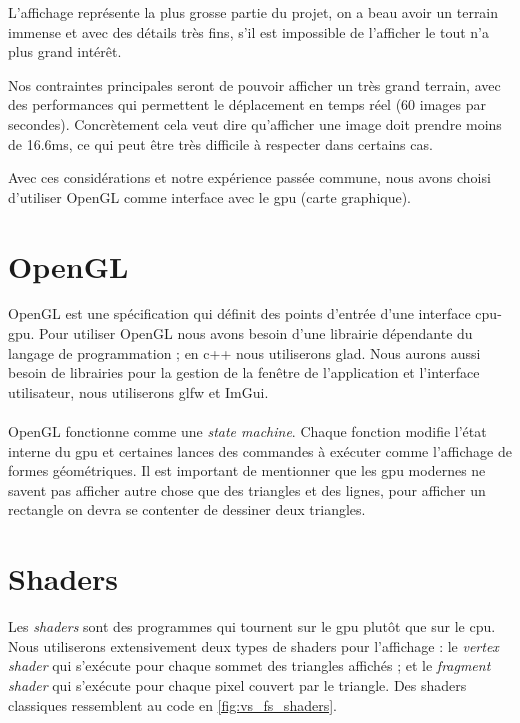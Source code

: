 \documentclass{EPUProjetDi}
\begin{document}
L'affichage représente la plus grosse partie du projet, on a beau avoir un terrain immense et avec des détails très fins, s'il est impossible de l'afficher le tout n'a plus grand intérêt.

Nos contraintes principales seront de pouvoir afficher un très grand terrain, avec des performances qui permettent le déplacement en temps réel (60 images par secondes). Concrètement cela veut dire qu'afficher une image doit prendre moins de 16.6ms, ce qui peut être très difficile à respecter dans certains cas.

Avec ces considérations et notre expérience passée commune, nous avons choisi d'utiliser OpenGL comme interface avec le gpu (carte graphique).

\section{OpenGL}

OpenGL est une spécification qui définit des points d'entrée d'une interface cpu-gpu. Pour utiliser OpenGL nous avons besoin d'une librairie dépendante du langage de programmation ; en c++ nous utiliserons glad. Nous aurons aussi besoin de librairies pour la gestion de la fenêtre de l'application et l'interface utilisateur, nous utiliserons glfw et ImGui.


\paragraph{}
OpenGL fonctionne comme une \textit{state machine}. Chaque fonction modifie l'état interne du gpu et certaines lances des commandes à exécuter comme l'affichage de formes géométriques.
Il est important de mentionner que les gpu modernes ne savent pas afficher autre chose que des triangles et des lignes, pour afficher un rectangle on devra se contenter de dessiner deux triangles.

\section{Shaders}
\label{sec:shaders}

Les \textit{shaders} sont des programmes qui tournent sur le gpu plutôt que sur le cpu. Nous utiliserons extensivement deux types de shaders pour l'affichage : le \textit{vertex shader} qui s'exécute pour chaque sommet des triangles affichés ; et le \textit{fragment shader} qui s'exécute pour chaque pixel couvert par le triangle. Des shaders classiques ressemblent au code en \ref{fig:vs_fs_shaders}.
\end{document}
